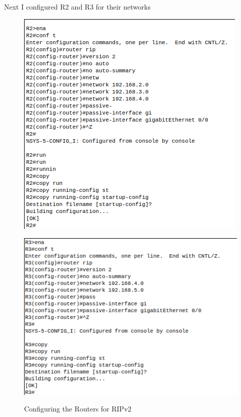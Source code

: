 \documentclass[../EngineeringJournal_CDavis.tex]{subfiles}
\begin{document}
Next I configured R2 and R3 for their networks

\begin{figure}[!hbt]
  \begin{minipage}[c]{0.4\linewidth}
    \centering
      \includegraphics[scale=0.24]{Figures/2020-01-31-031204_420x418_scrot.png}
      \label{config7bR2}
  \end{minipage}\hfill
  \begin{minipage}[c]{0.4\linewidth}
    \centering
    \includegraphics[scale=0.24]{Figures/2020-01-31-032105_438x322_scrot.png}
    \label{config7bR3}
  \end{minipage}
  \caption{Configuring the Routers for RIPv2}\label{config7b}
\end{figure}
\end{document}
